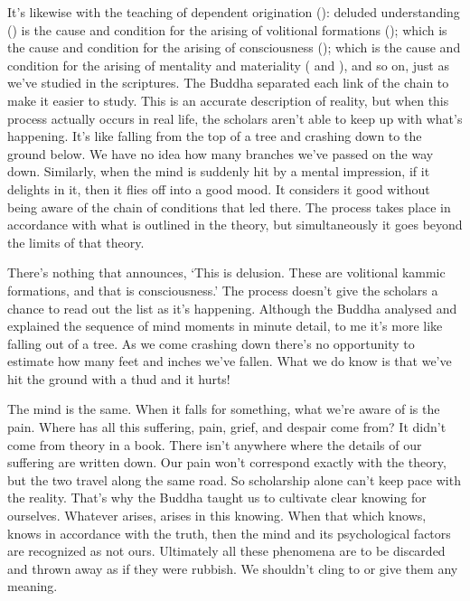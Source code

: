 It's likewise with the teaching of dependent origination (): deluded understanding () is the cause and condition for the arising of volitional  formations (); which is the cause and condition for the arising of consciousness (); which is the cause and condition for the arising of mentality and materiality ( and ), and so on, just as we've studied in the scriptures. The Buddha separated each link of the chain to make it easier to study. This is an accurate description of reality, but when this process actually occurs in real life, the scholars aren't able to keep up with what's happening. It's like falling from the top of a tree and crashing down to the ground below. We have no idea how many branches we've passed on the way down. Similarly, when the mind is suddenly hit by a mental impression, if it delights in it, then it flies off into a good mood. It considers it good without being aware of the chain of conditions that led there. The process takes place in accordance with what is outlined in the theory, but simultaneously it goes beyond the limits of that theory.

There's nothing that announces, `This is delusion. These are volitional kammic formations, and that is consciousness.' The process doesn't give the scholars a chance to read out the list as it's happening. Although the Buddha analysed and explained the sequence of mind moments in minute detail, to me it's more like falling out of a tree. As we come crashing down there's no opportunity to estimate how many feet and inches we've fallen. What we do know is that we've hit the ground with a thud and it hurts!

The mind is the same. When it falls for something, what we're aware of is the pain. Where has all this suffering, pain, grief, and despair come from? It didn't come from theory in a book. There isn't anywhere where the details of our suffering are written down. Our pain won't correspond exactly with the theory, but the two travel along the same road. So scholarship alone can't keep pace with the reality. That's why the Buddha taught us to cultivate clear knowing for ourselves. Whatever arises, arises in this knowing. When that which knows, knows in accordance with the truth, then the mind and its psychological factors are recognized as not ours. Ultimately all these phenomena are to be discarded and thrown away as if they were rubbish. We shouldn't cling to or give them any meaning.

